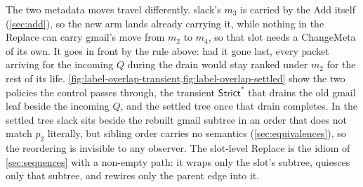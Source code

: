 \documentclass[sigplan,anonymous,review,nonacm]{acmart}
\newcommand{\Strictstar}{\textsf{Strict}^{*}}
\newcommand{\Add}{\textsf{Add}}
\newcommand{\ChangeMeta}{\textsf{ChangeMeta}}
\newcommand{\Replace}{\textsf{Replace}}
\begin{document}
The two metadata moves travel differently.
\textsf{slack}'s \(m_3\) is carried by the \Add{} itself (\cref{sec:add}), so the new arm lands already carrying it, while nothing in the \Replace{} can carry \textsf{gmail}'s move from \(m_2\) to \(m_4\), so that slot needs a \ChangeMeta{} of its own.
It goes in front by the rule above: had it gone last, every packet arriving for the incoming \(Q\) during the drain would stay ranked under \(m_2\) for the rest of its life.
\cref{fig:label-overlap-transient,fig:label-overlap-settled} show the two policies the control passes through, the transient \(\Strictstar\) that drains the old \textsf{gmail} leaf beside the incoming \(Q\), and the settled tree once that drain completes.
In the settled tree \textsf{slack} sits beside the rebuilt \textsf{gmail} subtree in an order that does not match \(p_2\) literally, but sibling order carries no semantics (\cref{sec:equivalences}), so the reordering is invisible to any observer.
The slot-level \Replace{} is the idiom of \cref{sec:sequences} with a non-empty path: it wraps only the slot's subtree, quiesces only that subtree, and rewires only the parent edge into it.
\end{document}
